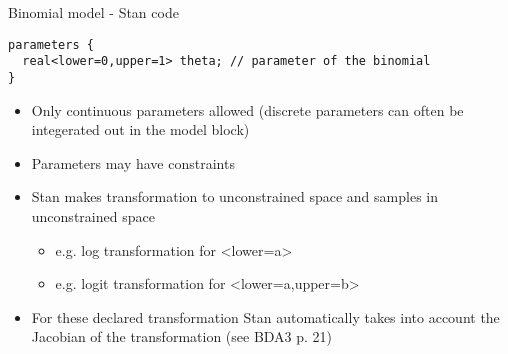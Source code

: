 \documentclass[finnish,english,t]{beamer}
\begin{document}
\begin{frame}[fragile]{Binomial model - Stan code}

  {\small
\begin{verbatim}
parameters {
  real<lower=0,upper=1> theta; // parameter of the binomial
}
\end{verbatim}
  }

  \begin{itemize}
  \item Only continuous parameters allowed (discrete parameters can
    often be integerated out in the model block)
  \item Parameters may have constraints
  \item Stan makes transformation to unconstrained space and samples in unconstrained space
    \begin{itemize}
    \item e.g. log transformation for <lower=a> 
    \item e.g. logit transformation for <lower=a,upper=b> 
    \end{itemize}
  \item<2-> For these declared transformation Stan automatically takes
    into account the Jacobian of the transformation (see BDA3 p. 21)
  \end{itemize}
\end{frame}
\end{document}
